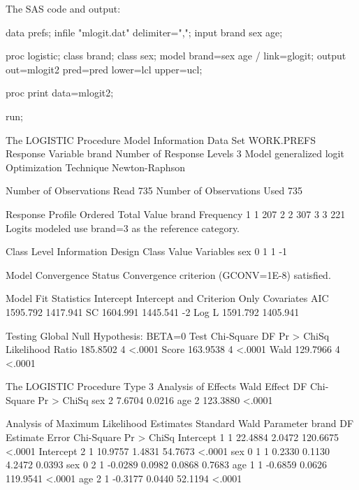 \documentclass{article}
\begin{document}
The SAS code and output:
\begin{Winput}
data prefs;
  infile "mlogit.dat" delimiter=",";
  input brand sex age;

proc logistic;
  class brand;
  class sex;
  model brand=sex age / link=glogit;
  output out=mlogit2 pred=pred lower=lcl upper=ucl;

proc print data=mlogit2;

run;
\end{Winput}
\begin{Woutput}
The LOGISTIC Procedure
               Model Information
Data Set                      WORK.PREFS
Response Variable             brand
Number of Response Levels     3
Model                         generalized logit
Optimization Technique        Newton-Raphson

Number of Observations Read         735
Number of Observations Used         735

          Response Profile
 Ordered                      Total
   Value        brand     Frequency
       1            1           207
       2            2           307
       3            3           221
Logits modeled use brand=3 as the reference category.

   Class Level Information
                      Design
Class     Value     Variables
sex       0                 1
          1                -1

                    Model Convergence Status
         Convergence criterion (GCONV=1E-8) satisfied.

         Model Fit Statistics
                             Intercept
              Intercept            and
Criterion          Only     Covariates
AIC            1595.792       1417.941
SC             1604.991       1445.541
-2 Log L       1591.792       1405.941

        Testing Global Null Hypothesis: BETA=0
Test                 Chi-Square       DF     Pr > ChiSq
Likelihood Ratio       185.8502        4         <.0001
Score                  163.9538        4         <.0001
Wald                   129.7966        4         <.0001

The LOGISTIC Procedure
        Type 3 Analysis of Effects
                        Wald
Effect      DF    Chi-Square    Pr > ChiSq
sex          2        7.6704        0.0216
age          2      123.3880        <.0001

                   Analysis of Maximum Likelihood Estimates
                                          Standard          Wald
Parameter      brand    DF    Estimate       Error    Chi-Square    Pr > ChiSq
Intercept      1         1     22.4884      2.0472      120.6675        <.0001
Intercept      2         1     10.9757      1.4831       54.7673        <.0001
sex       0    1         1      0.2330      0.1130        4.2472        0.0393
sex       0    2         1     -0.0289      0.0982        0.0868        0.7683
age            1         1     -0.6859      0.0626      119.9541        <.0001
age            2         1     -0.3177      0.0440       52.1194        <.0001


\end{Woutput}
\end{document}
